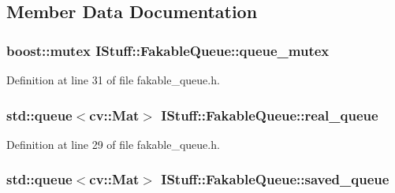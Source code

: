 \subsection{Member Data Documentation}
\hypertarget{class_i_stuff_1_1_fakable_queue_a463ced47c344cac9858ddb9c3a2a5fc6}{
\subsubsection[{queue\-\_\-mutex}]{\setlength{\rightskip}{0pt plus 5cm}boost\-::mutex I\-Stuff\-::\-Fakable\-Queue\-::queue\-\_\-mutex\hspace{0.3cm}{\ttfamily [private]}}}\label{class_i_stuff_1_1_fakable_queue_a463ced47c344cac9858ddb9c3a2a5fc6}


Definition at line 31 of file fakable\-\_\-queue.\-h.

\hypertarget{class_i_stuff_1_1_fakable_queue_a572a03879f073d8fa1babbfbf4b9d573}{
\subsubsection[{real\-\_\-queue}]{\setlength{\rightskip}{0pt plus 5cm}std\-::queue$<$cv\-::\-Mat$>$ I\-Stuff\-::\-Fakable\-Queue\-::real\-\_\-queue\hspace{0.3cm}{\ttfamily [private]}}}\label{class_i_stuff_1_1_fakable_queue_a572a03879f073d8fa1babbfbf4b9d573}


Definition at line 29 of file fakable\-\_\-queue.\-h.

\hypertarget{class_i_stuff_1_1_fakable_queue_a4204d286617b6b3e9c1732946e06d0ad}{
\subsubsection[{saved\-\_\-queue}]{\setlength{\rightskip}{0pt plus 5cm}std\-::queue$<$cv\-::\-Mat$>$ I\-Stuff\-::\-Fakable\-Queue\-::saved\-\_\-queue\hspace{0.3cm}{\ttfamily [private]}}}\label{class_i_stuff_1_1_fakable_queue_a4204d286617b6b3e9c1732946e06d0ad}



